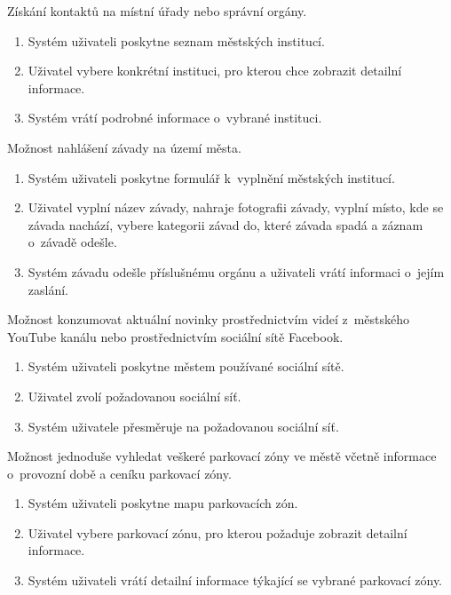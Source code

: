 Získání kontaktů na místní úřady nebo správní orgány. 

\begin{enumerate}
  \item Systém uživateli poskytne seznam městských institucí.
  \item Uživatel vybere konkrétní instituci, pro kterou chce zobrazit detailní informace.
  \item Systém vrátí podrobné informace o~vybrané instituci.  
\end{enumerate}

Možnost nahlášení závady na území města.

\begin{enumerate}
  \item Systém uživateli poskytne formulář k~vyplnění městských institucí.
  \item Uživatel vyplní název závady, nahraje fotografii závady, vyplní místo, kde se závada nachází, vybere kategorii závad do, které závada spadá a 
  záznam o~závadě odešle.
  \item Systém závadu odešle příslušnému orgánu a uživateli vrátí informaci o~jejím zaslání.
  
\end{enumerate}

Možnost konzumovat aktuální novinky prostřednictvím videí z~městského YouTube kanálu nebo prostřednictvím sociální sítě Facebook.

\begin{enumerate}
  \item Systém uživateli poskytne městem používané sociální sítě.
  \item Uživatel zvolí požadovanou sociální síť.
  \item Systém uživatele přesměruje na požadovanou sociální síť.
\end{enumerate}

Možnost jednoduše vyhledat veškeré parkovací zóny ve městě včetně informace o~provozní době a ceníku parkovací zóny.

\begin{enumerate}
  \item Systém uživateli poskytne mapu parkovacích zón.
  \item Uživatel vybere parkovací zónu, pro kterou požaduje zobrazit detailní informace.
  \item Systém uživateli vrátí detailní informace týkající se vybrané parkovací zóny.
\end{enumerate}

